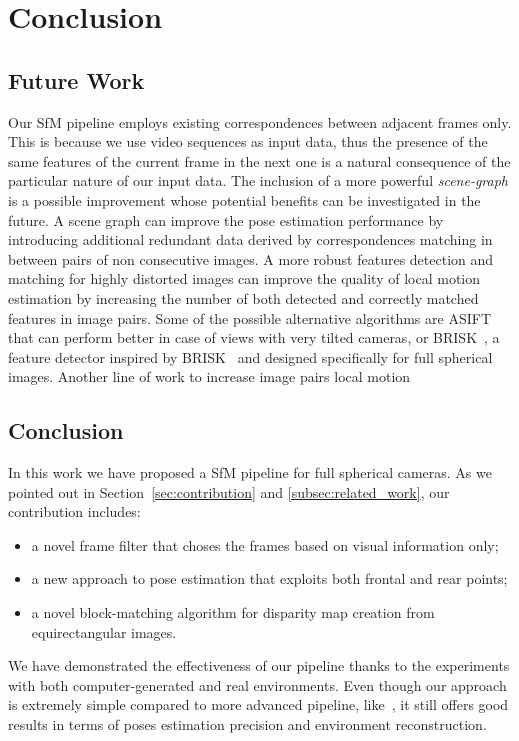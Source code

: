 \chapter{Conclusion}
%
\section{Future Work}
Our SfM pipeline employs existing correspondences between adjacent frames only.
This is because we use video sequences as input data, thus the presence of
the same features of the current frame in the next one is a natural consequence
of the particular nature of our input data.
The inclusion of a more powerful \emph{scene-graph} is a possible improvement
whose potential benefits can be investigated in the future.
A scene graph can improve the pose estimation
performance by introducing additional redundant data derived by 
correspondences matching in between pairs of non consecutive images.
A more robust features detection and matching for highly distorted images
can improve the quality of local motion estimation by increasing the number
of both detected and correctly matched features in image pairs.
Some of the possible alternative algorithms are ASIFT~\cite{morel2009asift}
that can perform better in case of views with very tilted cameras,
or BRISK~\cite{guan2017brisks}, a feature detector inspired by
BRISK~\cite{leutenegger2011brisk} and designed specifically for full spherical
images.
Another line of work to increase image pairs local motion
\section{Conclusion}
In this work we have proposed a SfM pipeline for full spherical cameras.
As we pointed out in Section~\ref{sec:contribution} and
\ref{subsec:related_work}, our contribution includes:
\begin{itemize}
	\item a novel frame filter that choses the frames based on visual
	information only;
	\item a new approach to pose estimation that exploits both frontal and rear
	points;
	\item a novel block-matching algorithm for disparity map creation from
	equirectangular images.
\end{itemize}
We have demonstrated the effectiveness of our pipeline thanks to the
experiments with both computer-generated and real environments.
Even though our approach is extremely simple compared to more advanced pipeline,
like~\cite{schonberger2016structure}, it still offers good results in terms of
poses estimation precision and environment reconstruction.
